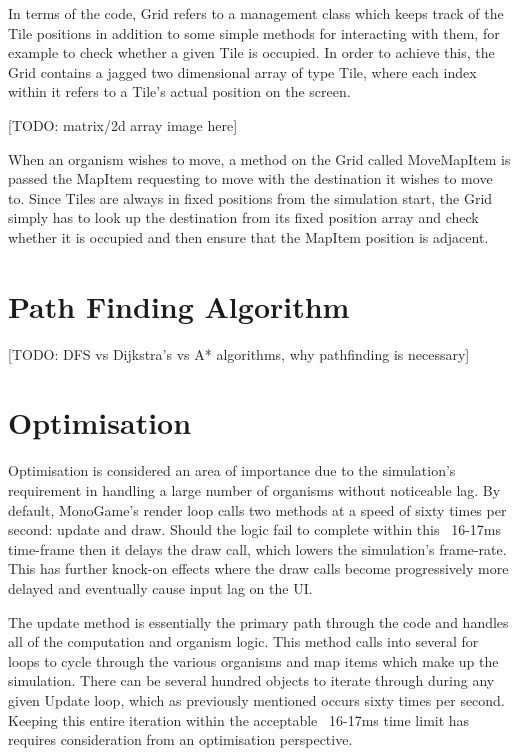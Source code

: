 \documentclass[a4paper, oneside, 11pt]{report}
\begin{document}
In terms of the code, Grid refers to a management class which keeps track of the Tile positions in addition to some simple methods for interacting with them, for example to check whether a given Tile is occupied. In order to achieve this, the Grid contains a jagged two dimensional array of type Tile, where each index within it refers to a Tile's actual position on the screen.

[TODO: matrix/2d array image here]

When an organism wishes to move, a method on the Grid called MoveMapItem is passed the MapItem requesting to move with the destination it wishes to move to. Since Tiles are always in fixed positions from the simulation start, the Grid simply has to look up the destination from its fixed position array and check whether it is occupied and then ensure that the MapItem position is adjacent.

\section{Path Finding Algorithm}\label{pathfinding}
[TODO: DFS vs Dijkstra's vs A* algorithms, why pathfinding is necessary]

\section{Optimisation}\label{optim}
Optimisation is considered an area of importance due to the simulation's requirement in handling a large number of organisms without noticeable lag. By default, MonoGame's render loop calls two methods at a speed of sixty times per second: update and draw. Should the logic fail to complete within this ~16-17ms time-frame then it delays the draw call, which lowers the simulation's frame-rate. This has further knock-on effects where the draw calls become progressively more delayed and eventually cause input lag on the UI.

The update method is essentially the primary path through the code and handles all of the computation and organism logic. This method calls into several for loops to cycle through the various organisms and map items which make up the simulation. There can be several hundred objects to iterate through during any given Update loop, which as previously mentioned occurs sixty times per second. Keeping this entire iteration within the acceptable ~16-17ms time limit has requires consideration from an optimisation perspective.
\end{document}
